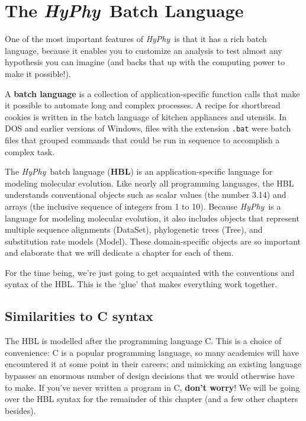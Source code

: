 \documentclass[12pt,twoside,openright]{book}
\newcommand{\hyphy}{\textit{HyPhy}}
\begin{document}
\chapter {The \hyphy\ Batch Language}

One of the most important features of \hyphy\ is that it has a rich batch language, because it enables you to customize an analysis to test almost any hypothesis you can imagine (and backs that up with the computing power to make it possible!).  

A \textbf{batch language} is a collection of application-specific function calls that make it possible to automate long and complex processes.  A recipe for shortbread cookies is written in the batch language of kitchen appliances and utensils.  In DOS and earlier versions of Windows, files with the extension {\tt .bat} were batch files that grouped commands that could be run in sequence to accomplish a complex task.  

 The \hyphy\ batch language (\textbf{HBL}) is an application-specific language for modeling molecular evolution.  Like nearly all programming languages, the HBL understands conventional objects such as scalar values (the number 3.14) and arrays (the inclusive sequence of integers from 1 to 10).  Because \hyphy\ is a language for modeling molecular evolution, it also includes objects that represent multiple sequence alignments (DataSet), phylogenetic trees (Tree), and substitution rate models (Model).  These domain-specific objects are so important and elaborate that we will dedicate a chapter for each of them. 

 For the time being, we're just going to get acquainted with the conventions and syntax of the HBL.  This is the `glue' that makes everything work together.


\section {Similarities to C syntax}

The HBL is modelled after the programming language C.  This is a choice of convenience: C is a popular programming language, so many academics will have encountered it at some point in their careers; and mimicking an existing language bypasses an enormous number of design decisions that we would otherwise have to make.  If you've never written a program in C, \textbf{don't worry}!  We will be going over the HBL syntax for the remainder of this chapter (and a few other chapters besides).  
\end{document}

